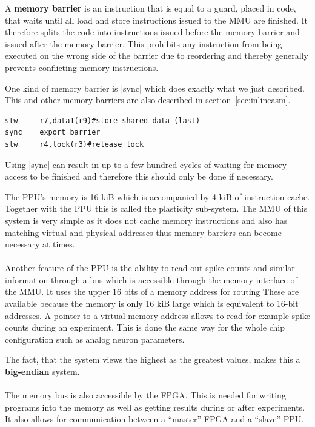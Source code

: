 {A \textbf{memory barrier} is an instruction that is equal to a guard, placed in code, that waits until all load and store instructions issued to the \ac{MMU} are finished.
It therefore splits the code into instructions issued before the memory barrier and issued after the memory barrier.
This prohibits any instruction from being executed on the wrong side of the barrier due to reordering and thereby generally prevents conflicting memory instructions.

One kind of memory barrier is |sync| which does exactly what we just described.
This and other memory barriers are also described in section~\ref{sec:inlineasm}.

\begin{lstlisting}[caption=The memory barrier ensures that the first store was performed before the second store is issued., label=lst:sync]
stw     r7,data1(r9)#store shared data (last)
sync    export barrier
stw     r4,lock(r3)#release lock
\end{lstlisting}

Using |sync| can result in up to a few hundred cycles of waiting for memory access to be finished and therefore this should only be done if necessary.

The \ac{PPU}'s memory is 16 kiB which is accompanied by 4 kiB of instruction cache.
Together with the \ac{PPU} this is called the plasticity sub-system.
The \ac{MMU} of this system is very simple as it does not cache memory instructions and also has matching virtual and physical addresses thus memory barriers can become necessary at times.
\\
\\
Another feature of the \ac{PPU} is the ability to read out spike counts and similar information through a bus which is accessible through the memory interface of the \ac{MMU}.
It uses the upper 16 bits of a memory address for routing
These are available because the memory is only 16 kiB large which is equivalent to 16-bit addresses.
A pointer to a virtual memory address allows to read for example spike counts during an experiment.
This is done the same way for the whole chip configuration such as analog neuron parameters.

The fact, that the system views the highest as the greatest values, makes this a \textbf{big-endian} system.
\\
\\
The memory bus is also accessible by the \ac{FPGA}.
This is needed for writing programs into the memory as well as getting results during or after experiments.
It also allows for communication between a ``master'' \ac{FPGA} and a ``slave'' \ac{PPU}.

}
